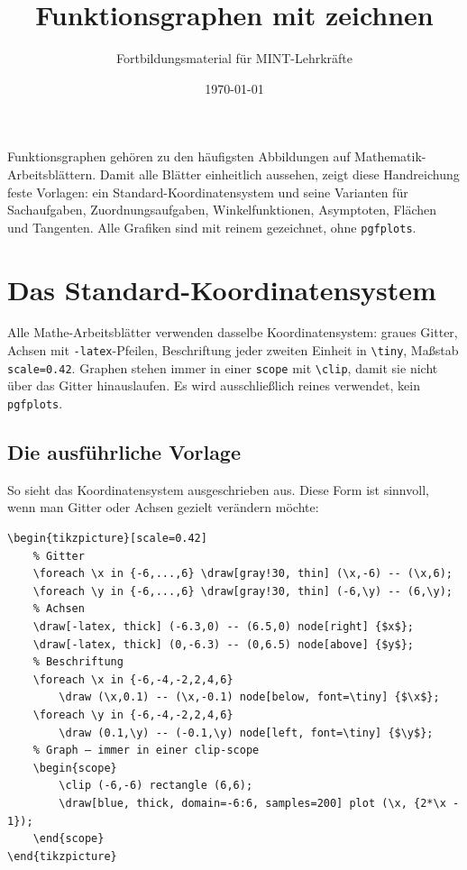 



\title{Funktionsgraphen mit \TikZ zeichnen}
\author{Fortbildungsmaterial für MINT-Lehrkräfte}
\date{\today}
\pagestyle{plain}
\setlength{\parskip}{1.5em} %




\maketitle

Funktionsgraphen gehören zu den häufigsten Abbildungen auf Mathematik-Arbeitsblättern. Damit alle Blätter einheitlich aussehen, zeigt diese Handreichung feste Vorlagen: ein Standard-Koordinatensystem und seine Varianten für Sachaufgaben, Zuordnungsaufgaben, Winkelfunktionen, Asymptoten, Flächen und Tangenten. Alle Grafiken sind mit reinem \TikZ gezeichnet, ohne \texttt{pgfplots}.



\section{Das Standard-Koordinatensystem}

Alle Mathe-Arbeitsblätter verwenden dasselbe Koordinatensystem: graues Gitter, Achsen mit \texttt{-latex}-Pfeilen, Beschriftung jeder zweiten Einheit in \texttt{\textbackslash tiny}, Maßstab \texttt{scale=0.42}. Graphen stehen immer in einer \texttt{scope} mit \texttt{\textbackslash clip}, damit sie nicht über das Gitter hinauslaufen. Es wird ausschließlich reines \TikZ verwendet, kein \texttt{pgfplots}.


\subsection{Die ausführliche Vorlage}

So sieht das Koordinatensystem ausgeschrieben aus. Diese Form ist sinnvoll, wenn man Gitter oder Achsen gezielt verändern möchte:

\begin{lstlisting}[style=latex]
\begin{tikzpicture}[scale=0.42]
	% Gitter
	\foreach \x in {-6,...,6} \draw[gray!30, thin] (\x,-6) -- (\x,6);
	\foreach \y in {-6,...,6} \draw[gray!30, thin] (-6,\y) -- (6,\y);
	% Achsen
	\draw[-latex, thick] (-6.3,0) -- (6.5,0) node[right] {$x$};
	\draw[-latex, thick] (0,-6.3) -- (0,6.5) node[above] {$y$};
	% Beschriftung
	\foreach \x in {-6,-4,-2,2,4,6}
		\draw (\x,0.1) -- (\x,-0.1) node[below, font=\tiny] {$\x$};
	\foreach \y in {-6,-4,-2,2,4,6}
		\draw (0.1,\y) -- (-0.1,\y) node[left, font=\tiny] {$\y$};
	% Graph – immer in einer clip-scope
	\begin{scope}
		\clip (-6,-6) rectangle (6,6);
		\draw[blue, thick, domain=-6:6, samples=200] plot (\x, {2*\x - 1});
	\end{scope}
\end{tikzpicture}
\end{lstlisting}

